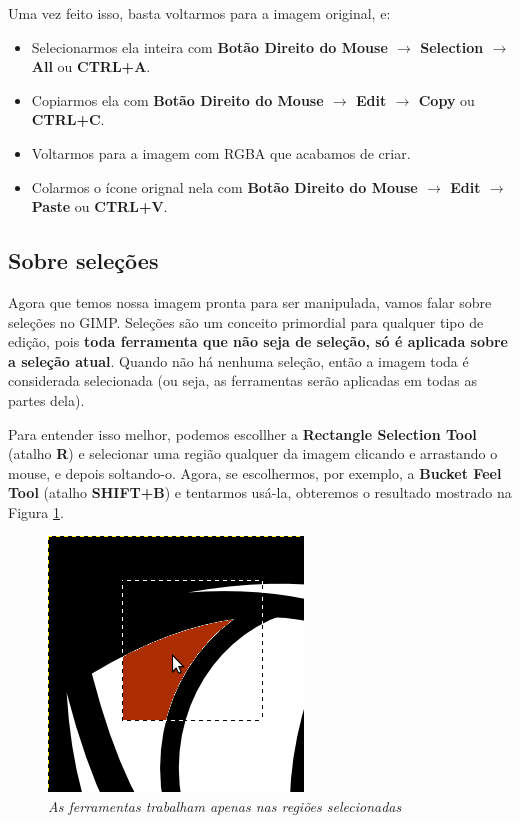 \documentclass[12pt,onecolumn]{article}
\begin{document}
    Uma vez feito isso, basta voltarmos para a imagem original, e:
    
    \begin{itemize}
      \item
        Selecionarmos ela inteira com {\bf Botão Direito do Mouse $\rightarrow$
        Selection $\rightarrow$ All} ou {\bf CTRL+A}.
      \item
        Copiarmos ela com {\bf Botão Direito do Mouse $\rightarrow$ Edit
        $\rightarrow$ Copy} ou {\bf CTRL+C}.
      \item
        Voltarmos para a imagem com RGBA que acabamos de criar.
      \item
        Colarmos o ícone orignal nela com {\bf Botão Direito do Mouse
        $\rightarrow$ Edit $\rightarrow$ Paste} ou {\bf CTRL+V}.
    \end{itemize}
    
    
  \subsection{Sobre seleções}
    Agora que temos nossa imagem pronta para ser manipulada, vamos falar sobre
    seleções no GIMP. Seleções são um conceito primordial para qualquer tipo de
    edição, pois {\bf toda ferramenta que não seja de seleção, só é aplicada
    sobre a seleção atual}. Quando não há nenhuma seleção, então a imagem toda
    é considerada selecionada (ou seja, as ferramentas serão aplicadas em todas
    as partes dela).
    
    Para entender isso melhor, podemos escollher a {\bf Rectangle Selection
    Tool} (atalho {\bf R}) e selecionar uma região qualquer da imagem
    clicando e arrastando o mouse, e depois soltando-o. Agora, se escolhermos,
    por exemplo, a {\bf Bucket Feel Tool} (atalho {\bf SHIFT+B}) e tentarmos
    usá-la, obteremos o resultado mostrado na Figura
    \ref{fig:selective_painting}.
  
    \begin{figure}[H]
      \centering
      \includegraphics[scale=0.6]{screenshots/01-selective_painting.png}
      \caption{
        \footnotesize
        \it
        As ferramentas trabalham apenas nas regiões selecionadas
      }
      \label{fig:selective_painting}
    \end{figure}
    
\end{document}
